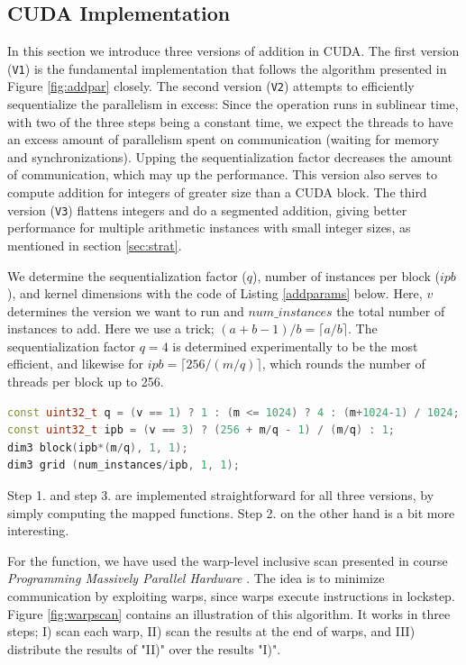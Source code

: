 \subsection{CUDA Implementation}
\label{subsec:addcud}

In this section we introduce three versions of addition in CUDA. The first
version (\texttt{V1}) is the fundamental implementation that follows the
algorithm presented in Figure \ref{fig:addpar} closely. The second version
(\texttt{V2}) attempts to efficiently sequentialize the parallelism in excess:
Since the operation runs in sublinear time, with two of the three steps being a
constant time, we expect the threads to have an excess amount of parallelism
spent on communication (waiting for memory and synchronizations). Upping the
sequentialization factor decreases the amount of communication, which may up the
performance. This version also serves to compute addition for integers of
greater size than a CUDA block. The third version (\texttt{V3}) flattens
integers and do a segmented addition, giving better performance for multiple
arithmetic instances with small integer sizes, as mentioned in section
\ref{sec:strat}.

We determine the sequentialization factor ($q$), number of instances per block
($\mathit{ipb}$), and kernel dimensions with the code of Listing \ref{addparams}
below. Here, $v$ determines the version we want to run and
$\mathit{num\_instances}$ the total number of instances to add. Here we use a
trick; $(a + b - 1) / b = \lceil a / b \rceil$. The sequentialization factor
$q=4$ is determined experimentally to be the most efficient, and likewise for
$\mathit{ipb} = \lceil 256 / (m/q) \rceil$, which rounds the number of threads per block
up to 256.
\begin{lstlisting}[language=CPP,caption={\footnotesize CUDA addition parameters and kernel dimensions.},label={addparams}]
const uint32_t q = (v == 1) ? 1 : (m <= 1024) ? 4 : (m+1024-1) / 1024;
const uint32_t ipb = (v == 3) ? (256 + m/q - 1) / (m/q) : 1;
dim3 block(ipb*(m/q), 1, 1);
dim3 grid (num_instances/ipb, 1, 1);
\end{lstlisting}

Step 1. and step 3. are implemented straightforward for all three versions, by
simply computing the mapped functions. Step 2. on the other hand is a bit more
interesting.

For the  function, we have used the warp-level inclusive scan
presented in course \textit{Programming Massively Parallel Hardware}
\cite{PMPH}. The idea is to minimize communication by exploiting warps, since
warps execute instructions in lockstep. Figure \ref{fig:warpscan} contains an
illustration of this algorithm. It works in three steps; I) scan each warp, II)
scan the results at the end of warps, and III) distribute the results of "II)"
over the results "I)".

